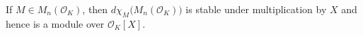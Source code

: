 \documentclass{sig-alternate-05-2015}
\DeclareMathOperator{\com}{Com}
\newcommand{\OK}{\mathcal{O}_K}
\def\todo#1{\ \!\!{\color{red} #1}}
\begin{document}
\begin{cor}
If $M \in M_n(\OK)$, then $d \chi_M \big(M_n(\OK)\big)$ 
is stable under multiplication by $X$ and hence is a module over $\OK[X]$.
\end{cor}


\begin{comment}
\begin{prop} \label{prop:factor_com}
Let $M \in M_n (\OK)$ be such that $discr(\chi (M)) \neq 0.$
We assume that $A=\com (X-M)$ is such that $gcd(A_{1,1}, \chi (M))=1$
(in $K[X]$).
Then for $U=col(A,1)$ and $V=A_{1,1}^{-1} row(A,1) \mod \chi (M),$
both in $\OK[X]^n,$ we have: 
\[ \com (X-M)= U \cdot {}^t V \mod \chi (M).\]
\todo{I think that the correct condition is $d \chi_M$ surjective (which is a bit weaker).}
\end{prop}


\begin{proof}
We first prove that for all $i,j \in \llbracket 1, n \rrbracket,$ we have
\begin{equation}A_{1,1} A_{i,j}=A_{1,i}A_{1,j} \mod \chi (M). \label{eqn:2-minors-com} \end{equation}
Let $\lambda$ be a root of $\chi (M)$ in an algebraic closure of $K.$
Then $A(\lambda)$ is of rank one.
Indeed, $A(\lambda) \times (\lambda-M) =0.$
Since $\chi (M)$ is square-free, then $\lambda-M$ is of rank $n-1$
and then $A(\lambda)$ is of rank at most one.
Nevertheless, we can remark that
 $gcd(A_{1,1}, \chi (M))=1,$ $A_{1,1} \neq 0 \mod (X-\lambda)$
and thus, $A(\lambda)$ is of rank exactly one.
As a consequence, all $2 \times 2$-minors of $A(\lambda)$ are zero.
It means that \[A_{1,1} A_{i,j}=A_{1,i}A_{1,j} \mod (X-\lambda). \]
By the Chinese Remainder Theorem, our first result is then proved.

Now, let us take $U=col(A,1)$ the first column of $A$ and
$V=A_{1,1}^{-1} row(A,1) \mod \chi (M)$ (as $A_{1,1}$ is
invertible $\mod \chi (M)).$
Then thanks to \eqref{eqn:2-minors-com}, $U$ and $V$ satisfy the desired equality. 
\end{proof}

\begin{rem}
If $M \in M_n (\OK)$ is such that for some $U,V \in O_{K}[X]^n$
we have $\com (X-M)= U \cdot {}^t V \mod \chi (M)$ and if 
$P\in GL_n (\OK)$ then
\[\com (X-PMP^{-1})=(PU) \cdot ( {}^tV P^{-1}) \mod \chi(M).\]
In other words, factorizability of $\com(X-M)$ is stable
by change of basis.
\end{rem}
\end{comment}
\end{document}
